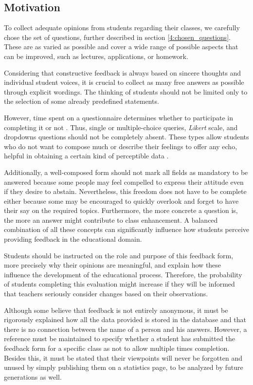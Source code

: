     \subsection{Motivation} \label{4:motivation}

    To collect adequate opinions from students regarding their classes, we carefully chose the set of questions, further described in section \ref{4:chosen_questions}. These are as varied as possible and cover a wide range of possible aspects that can be improved, such as lectures, applications, or homework.
    
    Considering that constructive feedback is always based on sincere thoughts and individual student voices, it is crucial to collect as many free answers as possible through explicit wordings. The thinking of students should not be limited only to the selection of some already predefined statements.
    
    However, time spent on a questionnaire determines whether to participate in completing it or not \cite{roszkowski1990}. Thus, single or multiple-choice queries, \textit{Likert} scale, and dropdowns questions should not be completely absent. These types allow students who do not want to compose much or describe their feelings to offer any echo, helpful in obtaining a certain kind of perceptible data \cite{reja2003questions}.
    
    Additionally, a well-composed form should not mark all fields as mandatory to be answered because some people may feel compelled to express their attitude even if they desire to abstain. Nevertheless, this freedom does not have to be complete either because some may be encouraged to quickly overlook and forget to have their say on the required topics. Furthermore, the more concrete a question is, the more an answer might contribute to class enhancement. A balanced combination of all these concepts can significantly influence how students perceive providing feedback in the educational domain.
    
	Students should be instructed on the role and purpose of this feedback form, more precisely why their opinions are meaningful, and explain how these influence the development of the educational process. Therefore, the probability of students completing this evaluation might increase if they will be informed that teachers seriously consider changes based on their observations.
	
	Although some believe that feedback is not entirely anonymous, it must be rigorously explained how all the data provided is stored in the database and that there is no connection between the name of a person and his answers. However, a reference must be maintained to specify whether a student has submitted the feedback form for a specific class as not to allow multiple times completion. Besides this, it must be stated that their viewpoints will never be forgotten and unused by simply publishing them on a statistics page, to be analyzed by future generations as well.
	
